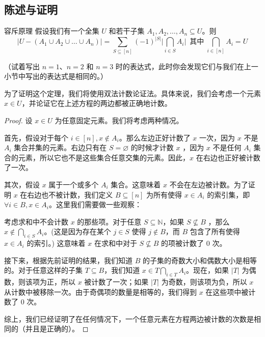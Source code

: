 
\subsection{陈述与证明}

\begin{theorem}{容斥原理}\label{theorem8.7.1}
    假设我们有一个全集 $U$ 和若干子集 $A_1, A_2, \dots, A_n \subseteq U$。则
    \[|U - (A_1 \cup A_2 \cup \dots \cup A_n)| = \sum_{S \subseteq [n]} (-1)^{|S|} \Bigg|\bigcap_{i \in S} A_i\Bigg| \enspace \text{其中}\; \bigcap_{i \in [n]} A_i = U\]
\end{theorem}
（试着写出 $n = 1$、$n = 2$ 和 $n = 3$ 时的表达式，此时你会发现它们与我们在上一小节中写出的表达式是相同的。）

为了证明这个定理，我们将使用双法计数论证法。具体来说，我们会考虑一个元素 $x \in U$，并论证它在上述方程的两边都被正确地计数。

\begin{proof}
    设 $x \in U$ 为任意固定元素。我们将考虑两种情况。

    首先，假设对于每个 $i \in [n], x \notin A_i$。那么左边正好计数了 $x$ 一次，因为 $x$ 不是 $A_i$ 集合并集的元素。右边只有在 $S = \varnothing$ 的时候才计数 $x$ ，因为 $x$ 不是任何 $A_i$ 集合的元素，所以它也不是这些集合任意交集的元素。因此，$x$ 在右边也正好被计数了一次。

    其次，假设 $x$ 属于一个或多个 $A_i$ 集合。这意味着 $x$ 不会在左边被计数。为了证明 $x$ 在右边也不被计数，我们定义 $B \subseteq [n]$ 为所有使得 $x \in A_i$ 的索引集，即 $\forall i \in B, x \in A_i$。这里我们需要做一些观察：
    
    考虑求和中不会计数 $x$ 的那些项。对于任意 $S \subseteq \mathbb{N}$，如果 $S \nsubseteq B$ ，那么 $x \notin \bigcap_{i \in S} A_i$。(这是因为存在某个 $j \in S$ 使得 $j \notin B$，而 $B$ 包含了所有使得 $x \in A_i$ 的索引。) 这意味着 $x$ 在求和中对于 $S \nsubseteq B$ 的项被计数了 $0$ 次。

    接下来，根据先前证明的结果，我们知道 $B$ 的子集的奇数大小和偶数大小是相等的。对于任意这样的子集 $T \subseteq B$，我们知道 $x \in T \bigcap_{i \in T} A_i$。现在，如果 $|T|$ 为偶数，则该项为正，所以 $x$ 被计数了一次；如果 $|T|$ 为奇数，则该项为负，所以 $x$ 从计数中被移除一次。由于奇偶项的数量是相等的，我们得到 $x$ 在这些项中被计数了 $0$ 次。

    综上，我们已经证明了在任何情况下，一个任意元素在方程两边被计数的次数是相同的（并且是正确的）。
\end{proof}

